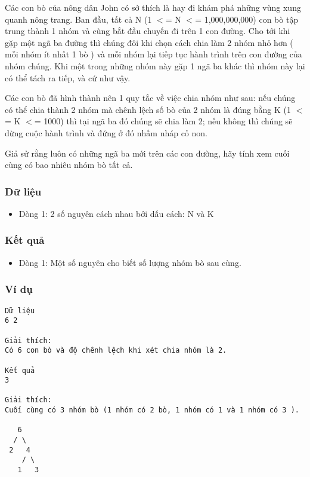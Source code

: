 



   Các con bò của nông dân John có sở thích là hay đi khám phá những  vùng xung quanh nông trang. Ban đầu, tất cả N (1 $<$= N $<$= 1,000,000,000)  con bò tập trung thành 1 nhóm và cùng bắt đầu chuyến đi trên  1 con đường. Cho tới khi gặp một ngã ba đường thì chúng đôi  khi chọn cách chia làm 2 nhóm nhỏ hơn ( mỗi nhóm ít nhất 1 bò )  và mỗi nhóm lại tiếp tục hành trình trên con đường của nhóm  chúng. Khi một trong những nhóm này gặp 1 ngã ba khác thì nhóm  này lại có thể tách ra tiếp, và cứ như vậy.  

   Các con bò đã hình thành nên 1 quy tắc về việc chia nhóm như sau: nếu  chúng có thể chia thành 2 nhóm mà chênh lệch số bò của 2 nhóm là đúng  bằng K (1 $<$= K $<$= 1000) thì tại ngã ba đó chúng sẽ chia làm 2; nếu  không thì chúng sẽ dừng cuộc hành trình và đứng ở đó nhấm nháp cỏ non.  

   Giả sử rằng luôn có những ngã ba mới trên các con đường, hãy  tính xem cuối cùng có bao nhiêu nhóm bò tất cả.  

\subsubsection{   Dữ liệu  }
\begin{itemize}
	\item     Dòng 1: 2 số nguyên cách nhau bởi dấu cách: N và K   
\end{itemize}

\subsubsection{   Kết quả  }
\begin{itemize}
	\item     Dòng 1: Một số nguyên cho biết số lượng nhóm bò sau cùng.   
\end{itemize}

\subsubsection{   Ví dụ  }
\begin{verbatim}
Dữ liệu
6 2

Giải thích:
Có 6 con bò và độ chênh lệch khi xét chia nhóm là 2.

Kết quả
3

Giải thích:
Cuối cùng có 3 nhóm bò (1 nhóm có 2 bò, 1 nhóm có 1 và 1 nhóm có 3 ).

   6
  / \
 2   4
    / \
   1   3
\end{verbatim}